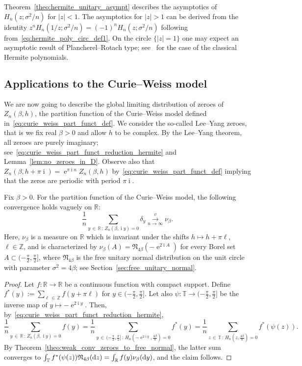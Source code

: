 \documentclass[AHL,Unicode,longabstracts,published]{cedram}
\DeclareMathOperator{\eee}{e}
\DeclareMathOperator{\ii}{i}
\newcommand{\fnorm}{\mathfrak{N}}
\newcommand{\bT}{\mathbb{T}}
\newcommand{\R}{\mathbb{R}}
\newcommand{\Z}{\mathbb{Z}}
\newcommand*\dint{\text{\normalfont d}}
\newcommand{\tovague}{\overset{v}{\underset{n\to\infty}\longrightarrow}}
\begin{document}
\begin{rema}
Theorem~\ref{theo:hermite_unitary_asympt} describes the asymptotics of $H_n(z;\sigma^2/n)$ for $|z|<1$. The asymptotics for $|z|>1$ can be derived from the identity $z^n H_n(1/z; \sigma^2/n) = (-1)^n H_n(z; \sigma^2/n)$ following from~\eqref{eq:hermite_poly_circ_def1}. On the circle $\{|z|=1\}$ one may expect an asymptotic result of Plancherel--Rotach type; see~\cite[Theorem~8.22.9]{szegoe_book} for the case of the classical Hermite polynomials.
\end{rema}

\subsection{Applications to the Curie--Weiss model}

We are now going to describe the global limiting distribution of zeroes of $Z_n(\beta, h)$, the partition function of the Curie--Weiss model defined in~\eqref{eq:curie_weiss_part_funct_def}. We consider the so-called Lee--Yang zeroes, that is we fix real $\beta>0$ and allow $h$ to be complex. By the Lee--Yang theorem, all zeroes are purely imaginary; see~\eqref{eq:curie_weiss_part_funct_reduction_hermite} and Lemma~\ref{lem:no_zeroes_in_D}. Observe also that $Z_n(\beta, h +\pi \ii) =
\eee^{\pi \ii n} Z_n(\beta, h)$ by~\eqref{eq:curie_weiss_part_funct_def} implying that the zeros are periodic with period $\pi \ii$.

\begin{coro}\label{cor:curie_weiss_zeroes}
Fix $\beta>0$. For the partition function of the Curie--Weiss model, the following convergence holds vaguely on $\R$:
\[
\frac 1n \sum_{y\,\in\,\R\,:\, Z_n(\beta, \ii y) = 0} \delta_{y} \tovague \nu_{\beta}.
\]
Here, $\nu_\beta$ is a measure on $\R$ which is invariant under the shifts $h\mapsto h + \pi \ell$, $\ell\in \Z$, and is characterized by $\nu_\beta(A) = \fnorm_{4\beta} (- \eee^{2 \ii A})$ for every Borel set $A\subset (-\frac{\pi}{2}, \frac{\pi}{2}]$, where $\fnorm_{4\beta}$ is the free unitary normal distribution on the unit circle with parameter $\sigma^2 = 4\beta$; see Section~\ref{sec:free_unitary_normal}.
\end{coro}

\begin{proof}
Let $f:\R \to \R$ be a continuous function with compact support. Define $f^*(y):= \sum_{\ell\,\in\,\Z} f(y + \pi \ell)$ for $y\in (-\frac{\pi}{2}, \frac{\pi}{2}]$. Let also $\psi: \bT \to (-\frac{\pi}{2}, \frac{\pi}{2}]$ be the inverse map of $y\mapsto -\eee^{2\ii y}$. Then, by~\eqref{eq:curie_weiss_part_funct_reduction_hermite},
\[
\frac 1n \sum_{y\,\in\,\R\,:\, Z_n(\beta, \ii y) = 0} f(y) =
\frac 1n \sum_{y\,\in\,(-\frac{\pi}{2}, \frac{\pi}{2}]\,:\, H_n\left(-\eee^{2\ii y}, \frac{4\beta}{n}\right) = 0} f^*(y) =
\frac 1n \sum_{z\,\in\,\bT\,:\, H_n\left(z, \frac{4\beta}{n}\right) = 0} f^*(\psi(z)).
\]
By Theorem~\ref{theo:weak_conv_zeroes_to_free_normal}, the latter sum converges to $\int_{\bT} f^*(\psi(z))\fnorm_{4\beta}(\dint z) = \int_{\R} f(y)\nu_{\beta}(\dint y)$, and the claim follows.
\end{proof}
\end{document}
